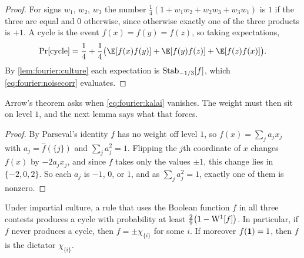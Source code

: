 \begin{refsection}
\begin{proof}
For signs $w_1$, $w_2$, $w_3$ the number $\frac14(1+w_1w_2+w_2w_3+w_3w_1)$ is $1$ if the three are equal and $0$ otherwise, since otherwise exactly one of the three products is $+1$. A cycle is the event $f(x)=f(y)=f(z)$, so taking expectations,
\[
  \Pr[\text{cycle}]=\frac14+\frac14\bigl(\E[f(x)f(y)]+\E[f(y)f(z)]+\E[f(z)f(x)]\bigr).
\]
By \cref{lem:fourier:culture} each expectation is $\operatorname{Stab}_{-1/3}[f]$, which \eqref{eq:fourier:noisecorr} evaluates.
\end{proof}


Arrow's theorem asks when \eqref{eq:fourier:kalai} vanishes. The weight must then sit on level $1$, and the next lemma says what that forces.


\begin{proof}
By Parseval's identity $f$ has no weight off level $1$, so $f(x)=\sum_ja_jx_j$ with $a_j=\hat f(\{j\})$ and $\sum_ja_j^2=1$. Flipping the $j$th coordinate of $x$ changes $f(x)$ by $-2a_jx_j$, and since $f$ takes only the values $\pm1$, this change lies in $\{-2,0,2\}$. So each $a_j$ is $-1$, $0$, or $1$, and as $\sum_ja_j^2=1$, exactly one of them is nonzero.
\end{proof}

\begin{theorem}\label{thm:fourier:arrowq}
Under impartial culture, a rule that uses the Boolean function $f$ in all three contests produces a cycle with probability at least $\frac29\bigl(1-\mathrm{W}^{1}[f]\bigr)$. In particular, if $f$ never produces a cycle, then $f=\pm\chi_{\{i\}}$ for some $i$. If moreover $f(\mathbf{1})=1$, then $f$ is the dictator $\chi_{\{i\}}$.
\end{theorem}


\end{refsection}
